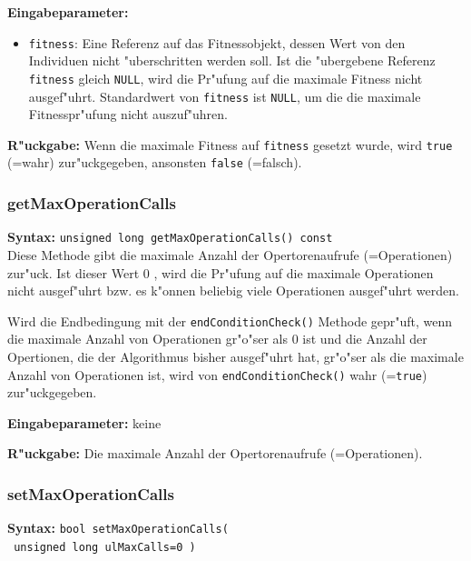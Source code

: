 \bigskip\noindent
\textbf{Eingabeparameter:}
\begin{itemize}
 \item \verb|fitness|: Eine Referenz auf das Fitnessobjekt, dessen Wert von den Individuen nicht "uberschritten werden soll. Ist die "ubergebene Referenz \verb|fitness| gleich \verb|NULL|, wird die Pr"ufung auf die maximale Fitness nicht ausgef"uhrt. Standardwert von \verb|fitness| ist \verb|NULL|, um die die maximale Fitnesspr"ufung nicht auszuf"uhren.
\end{itemize}

\bigskip\noindent
\textbf{R"uckgabe:} Wenn die maximale Fitness auf \verb|fitness| gesetzt wurde, wird \verb|true| (=wahr) zur"uckgegeben, ansonsten \verb|false| (=falsch).


\subsubsection{getMaxOperationCalls}

\textbf{Syntax:} \verb|unsigned long getMaxOperationCalls() const| \\

Diese Methode gibt die maximale Anzahl der Opertorenaufrufe (=Operationen) zur"uck. Ist dieser Wert $0$ , wird die Pr"ufung auf die maximale Operationen nicht ausgef"uhrt bzw. es k"onnen beliebig viele Operationen ausgef"uhrt werden.

Wird die Endbedingung mit der \verb|endConditionCheck()| Methode gepr"uft, wenn die maximale Anzahl von Operationen gr"o"ser als $0$ ist und die Anzahl der Opertionen, die der Algorithmus bisher ausgef"uhrt hat, gr"o"ser als die maximale Anzahl von Operationen ist, wird von \verb|endConditionCheck()| wahr (=\verb|true|) zur"uckgegeben.

\bigskip\noindent
\textbf{Eingabeparameter:} keine

\bigskip\noindent
\textbf{R"uckgabe:} Die maximale Anzahl der Opertorenaufrufe (=Operationen).


\subsubsection{setMaxOperationCalls}

\textbf{Syntax:} \verb|bool setMaxOperationCalls(| \\\verb| unsigned long ulMaxCalls=0 )| \\

